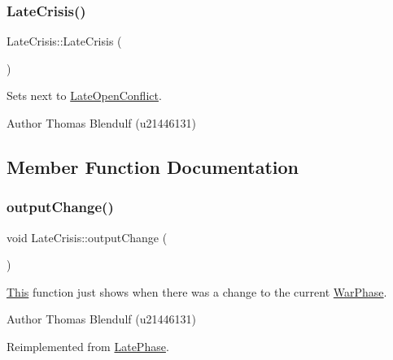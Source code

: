 \subsubsection{\texorpdfstring{LateCrisis()}{LateCrisis()}}
{\footnotesize\ttfamily Late\+Crisis\+::\+Late\+Crisis (\begin{DoxyParamCaption}{ }\end{DoxyParamCaption})}



Sets next to \mbox{\hyperlink{class_late_open_conflict}{Late\+Open\+Conflict}}. 

\begin{DoxyAuthor}{Author}
Thomas Blendulf (u21446131) 
\end{DoxyAuthor}


\subsection{Member Function Documentation}
\mbox{\label{class_late_crisis_ae7e081694e9dd087a9b5e7ea489145bf}} 
\subsubsection{\texorpdfstring{outputChange()}{outputChange()}}
{\footnotesize\ttfamily void Late\+Crisis\+::output\+Change (\begin{DoxyParamCaption}{ }\end{DoxyParamCaption})\hspace{0.3cm}{\ttfamily [virtual]}}



\mbox{\hyperlink{class_this}{This}} function just shows when there was a change to the current \mbox{\hyperlink{class_war_phase}{War\+Phase}}. 

\begin{DoxyAuthor}{Author}
Thomas Blendulf (u21446131) 
\end{DoxyAuthor}


Reimplemented from \mbox{\hyperlink{class_late_phase_a5df8ed1819ba8a826b923f7f3c349245}{Late\+Phase}}.

